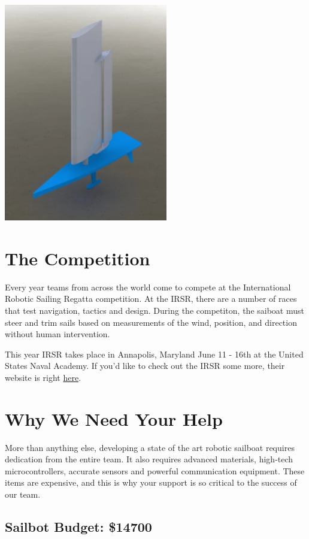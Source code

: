 \documentclass{article}
\begin{document}
\begin{center}
    \includegraphics[scale=0.6]{sailbotRender.png}
\end{center}

\section*{The Competition}
Every year teams from across the world come to compete at the International 
Robotic Sailing Regatta competition. At the IRSR, there are a number of races 
that test navigation, tactics and design. During the competiton, the saiboat 
must steer and trim sails based on measurements of the wind, position, and 
direction without human intervention.

This year IRSR takes place in Annapolis, Maryland June 11 - 16th at the United 
States Naval Academy. If you'd like to check out the IRSR some more, their 
website is right \href{http://sailbot.org}{here}.

\section*{Why We Need Your Help}

More than anything else, developing a state of the art robotic sailboat requires 
dedication from the entire team. It also requires advanced materials, high-tech 
microcontrollers, accurate sensors and powerful communication equipment. These 
items are expensive, and this is why your support is so critical to the success 
of our team.

\subsection*{Sailbot Budget: \$14700}
\end{document}
